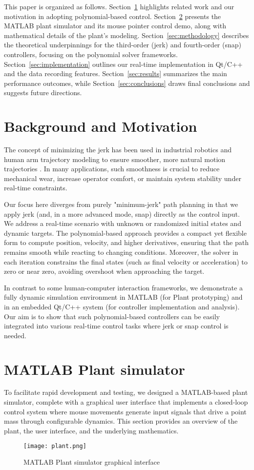 \documentclass[12pt]{article}
\begin{document}
This paper is organized as follows. Section~\ref{sec:background} highlights related work and our motivation in adopting polynomial-based control. Section~\ref{sec:mathplant} presents the MATLAB plant simulator and its mouse pointer control demo, along with mathematical details of the plant's modeling. Section~\ref{sec:methodology} describes the theoretical underpinnings for the third-order (jerk) and fourth-order (snap) controllers, focusing on the polynomial solver frameworks. Section~\ref{sec:implementation} outlines our real-time implementation in Qt/C++ and the data recording features. Section~\ref{sec:results} summarizes the main performance outcomes, while Section~\ref{sec:conclusions} draws final conclusions and suggests future directions.

\section{Background and Motivation}
\label{sec:background}
The concept of minimizing the jerk has been used in industrial robotics and human arm trajectory modeling to ensure smoother, more natural motion trajectories \cite{KyriakopoulosSaridis1988}. In many applications, such smoothness is crucial to reduce mechanical wear, increase operator comfort, or maintain system stability under real-time constraints.

Our focus here diverges from purely "minimum-jerk" path planning in that we apply jerk (and, in a more advanced mode, snap) directly as the control input. We address a real-time scenario with unknown or randomized initial states and dynamic targets. The polynomial-based approach provides a compact yet flexible form to compute position, velocity, and higher derivatives, ensuring that the path remains smooth while reacting to changing conditions. Moreover, the solver in each iteration constrains the final states (such as final velocity or acceleration) to zero or near zero, avoiding overshoot when approaching the target.

In contrast to some human-computer interaction frameworks, we demonstrate a fully dynamic simulation environment in MATLAB (for Plant prototyping) and in an embedded Qt/C++ system (for controller implementation and analysis). Our aim is to show that such polynomial-based controllers can be easily integrated into various real-time control tasks where jerk or snap control is needed.

\section{MATLAB Plant simulator}
\label{sec:mathplant}
To facilitate rapid development and testing, we designed a MATLAB-based plant simulator, complete with a graphical user interface that implements a closed-loop control system where mouse movements generate input signals that drive a point mass through configurable dynamics. This section provides an overview of the plant, the user interface, and the underlying mathematics.
\begin{figure}
    \centering
    \texttt{[image: plant.png]}
    \caption{MATLAB Plant simulator graphical interface}
    \label{fig:plant}
\end{figure}
\end{document}
